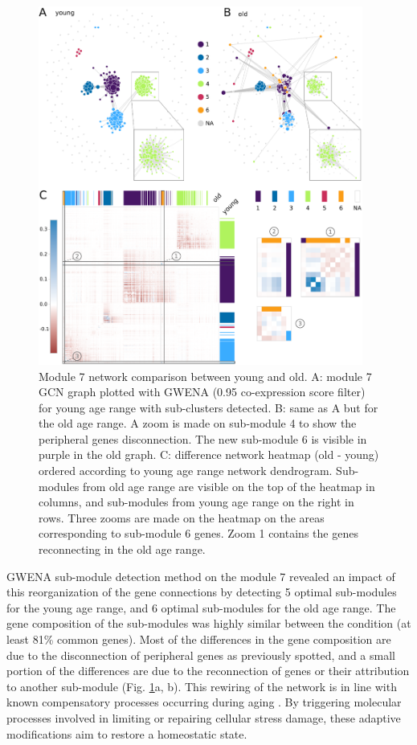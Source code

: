 \begin{figure}[!ht]
    \centering
    \includegraphics[width=0.95\textwidth]{img/chap1/figure_4.pdf}
    \caption{Module 7 network comparison between young and old. A: module 7 GCN graph plotted with GWENA (0.95 co-expression score filter) for young age range with sub-clusters detected. B: same as A but for the old age range. A zoom is made on sub-module 4 to show the peripheral genes disconnection. The new sub-module 6 is visible in purple in the old graph. C: difference network heatmap (old - young) ordered according to young age range network dendrogram. Sub-modules from old age range are visible on the top of the heatmap in columns, and sub-modules from young age range on the right in rows. Three zooms are made on the heatmap on the areas corresponding to sub-module 6 genes. Zoom \textcircled{\small{1}} contains the genes reconnecting in the old age range.}
    \label{fig:fig_graph_diff_cluster}
\end{figure}

GWENA sub-module detection method on the module 7 revealed an impact of this reorganization of the gene connections by detecting 5 optimal sub-modules for the young age range, and 6 optimal sub-modules for the old age range. The gene composition of the sub-modules was highly similar between the condition (at least 81\% common genes). Most of the differences in the gene composition are due to the disconnection of peripheral genes as previously spotted, and a small portion of the differences are due to the reconnection of genes or their attribution to another sub-module (Fig. \ref{fig:fig_graph_diff_cluster}a, b). This rewiring of the network is in line with known compensatory processes occurring during aging . By triggering molecular processes involved in limiting or repairing cellular stress damage, these adaptive modifications aim to restore a homeostatic state.

